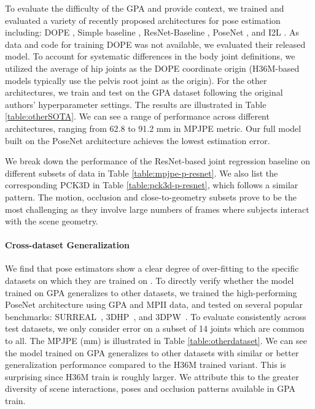 \documentclass[times,referee,twocolumn,final,authoryear]{elsarticle}
\begin{document}
To evaluate the difficulty of the GPA and provide context, we trained and 
evaluated a variety of recently proposed architectures for pose estimation including: 
DOPE \cite{dope},  Simple baseline \cite{simple}, ResNet-Baseline \cite{Zhou_2017_ICCV}, 
PoseNet \cite{rootnet}, 
and I2L \cite{Moon_2020_ECCV_I2L-MeshNet}. As data and code for training DOPE was not available,
we evaluated their released model. To account for systematic differences in the body joint definitions,
we utilized the average of hip joints as the DOPE coordinate origin (H36M-based models typically 
use the pelvis root joint as the origin). For the other architectures, we train and 
test on the GPA dataset following the original authors' hyperparameter settings. The results are illustrated 
in Table \ref{table:otherSOTA}. We can see a range of performance across different architectures,
ranging from 62.8 to 91.2 mm in MPJPE metric. Our full model built on the PoseNet architecture 
achieves the lowest estimation error. 

We break down the performance of the ResNet-based joint regression baseline on different 
subsets of data in Table \ref{table:mpjpe-p-resnet}.  We also list the corresponding PCK3D 
in Table \ref{table:pck3d-p-resnet}, which follows a similar pattern.
The motion, occlusion and close-to-geometry subsets prove to be the most challenging 
as they involve large numbers of frames where subjects interact with the scene geometry. 

\paragraph{Cross-dataset Generalization}

We find that pose estimators show a clear degree of over-fitting to the specific datasets on which they are trained on
\citep{crossdatasetevaluation}.  To directly verify whether the model trained on GPA generalizes to other datasets, we trained the high-performing PoseNet architecture using GPA and MPII \cite{mpii} data, and tested on several popular benchmarks: SURREAL~\cite{varol17_surreal}, 3DHP~\cite{mono_3dhp2017}, and 3DPW~\cite{inthewildeccv2018}. To evaluate consistently 
across test datasets, we only consider error on a subset of 14 joints which are common to all.  The MPJPE (mm) is 
illustrated in Table \ref{table:otherdataset}. We can see the model trained on GPA generalizes to other datasets with
similar or better generalization performance compared to the H36M trained variant. This is  surprising since H36M
train is roughly  larger. We attribute this to the greater diversity of scene interactions, poses and occlusion patterns 
available in GPA train.
\end{document}
